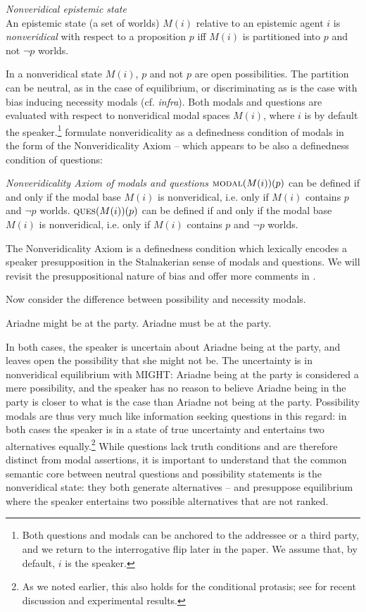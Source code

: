 \documentclass[output=paper,colorlinks,citecolor=brown]{langscibook}
\begin{document}
\ea  \textit{Nonveridical epistemic state}\\ 
An epistemic state (a set of worlds) $M(i)$  relative to  an epistemic agent $i$ is \textit{nonveridical}  with respect to a proposition $p$  iff $M(i)$ is partitioned into $p$ and  not $\neg p$ worlds.	
 \z

In a nonveridical state $M(i)$,  $p$ and not $p$ are open possibilities. The partition can be neutral, as in the case of equilibrium, or discriminating as is the case with bias inducing necessity modals (cf. \textit{infra}).   Both modals and questions are evaluated with respect to nonveridical modal spaces $M(i)$, where $i$ is by default the speaker.\footnote{Both questions and modals can be anchored to the addressee or a third party, and we return to the interrogative flip later in the paper. We assume that, by default, $i$ is the speaker.} \citet{giannakidoumari2016} formulate nonveridicality as a definedness condition of modals in the form of  the Nonveridicality Axiom --  which appears to be also a definedness condition of questions:

\ea \textit{Nonveridicality Axiom of modals and questions}
  \ea $\textsc{modal}(M(i))(p)$  can be defined if and only if the modal base $M(i)$ is nonveridical, i.e. only if $M(i)$  contains $p$ and $\neg p$ worlds. 
\ex \label{ques}
  $\textsc{ques}(M(i))(p)$  can be defined if and only if the modal base $M(i)$ is nonveridical, i.e. only if $M(i)$  contains $p$ and $\neg p$ worlds. 
  \z
  \z


The Nonveridicality Axiom is a definedness condition which lexically encodes a speaker presupposition in the Stalnakerian  sense of modals and questions.  We will revisit the presuppositional nature of bias and offer more comments in .

Now consider the difference between possibility and necessity modals. 

\ea \ea Ariadne might  be at the party.
\ex Ariadne must be at the party. 
\z
\z

\largerpage
In both cases, the speaker is uncertain about  Ariadne being at the party, and leaves open the possibility that she might not be. The uncertainty is in nonveridical equilibrium with \textsc{MIGHT}: Ariadne being at the party is considered a mere possibility, and the speaker has no reason to believe Ariadne being in the party is closer to what is the case than Ariadne not being at the party. Possibility modals are thus very much like information seeking questions in this regard: in both cases the speaker is in a  state of true uncertainty and entertains two alternatives equally.\footnote{As we noted earlier, this also holds for the  conditional protasis; see \citet{liu2021} for recent discussion and experimental results.} While questions lack truth conditions and are therefore distinct from modal assertions, it is important to understand that the common semantic core between neutral questions and possibility statements is the nonveridical state: they  both generate alternatives --  and  presuppose equilibrium where the speaker entertains two possible alternatives that are not ranked.
\end{document}

